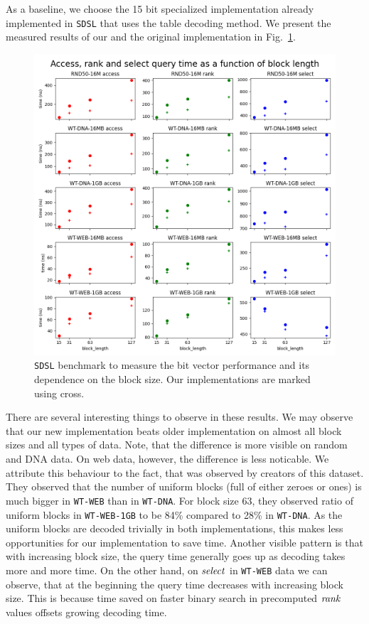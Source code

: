 As a baseline, we choose the 15 bit specialized implementation already implemented in \texttt{SDSL}
that uses the table decoding method. We present the measured results of our and the original
implementation in Fig.~\ref{obr:benchmark_sdsl_new_method}.

\begin{figure}
	\centerline{
		\includegraphics[width=\textwidth, height=0.7\textheight]{images/benchmark_sdsl_new_method}
	}
	\caption[TODO]{\texttt{SDSL} benchmark to measure the bit vector performance and its dependence
	on the block size. Our implementations are marked using cross.
	}
	\label{obr:benchmark_sdsl_new_method}
\end{figure}

There are several interesting things to observe in these results. We may observe that our new implementation
beats older implementation on almost all block sizes and all types of data. Note, that the difference is more
visible on random and DNA data. On web data, however, the difference is less noticable. We attribute
this behaviour to the fact, that was observed by creators of this dataset. They observed that the number of
uniform blocks (full of either zeroes or ones) is much bigger in \texttt{WT-WEB} than in \texttt{WT-DNA}.
For block size 63, they observed ratio of uniform blocks in \texttt{WT-WEB-1GB} to be 84\% compared to 28\% in
\texttt{WT-DNA}. As the uniform blocks are decoded trivially in both implementations, this makes less opportunities
for our implementation to save time. Another visible pattern is that with increasing block size, the query time
generally goes up as decoding takes more and more time. On the other hand, on $\mathit{select}$ in \texttt{WT-WEB} data
we can observe, that at the beginning the query time decreases with increasing block size. This is because time
saved on faster binary search in precomputed $\mathit{rank}$ values offsets growing decoding time.

